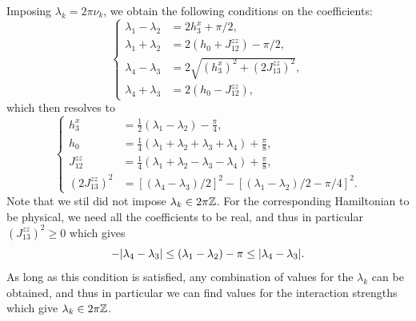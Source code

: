 Imposing $\lambda_k=2\pi\nu_k$, we obtain the following conditions on the coefficients:
\begin{equation}
\begin{cases}
    \lambda_1 - \lambda_2 &= 2 h_3^x + \pi/2, \\
    \lambda_1 + \lambda_2 &= 2(h_0 + J_{12}^{zz}) - \pi/2, \\
    \lambda_4 - \lambda_3 &= 2\sqrt{(h_3^x)^2+ (2J_{13}^{zz})^2}, \\
    \lambda_4 + \lambda_3 &= 2(h_0 - J_{12}^{zz}),
\end{cases}
\label{eq:toffoli_lambdas_vs_parameters}
\end{equation}
which then resolves to
\begin{equation}
\begin{cases}%
    h_3^x &= \frac{1}{2}(\lambda_1 - \lambda_2) - \frac{\pi}{4}, \\
    h_0 &= \frac{1}{4}(\lambda_1 + \lambda_2 + \lambda_3 + \lambda_4) + \frac{\pi}{8}, \\
    J_{12}^{zz} &= \frac{1}{4}(\lambda_1 + \lambda_2 - \lambda_3 - \lambda_4) + \frac{\pi}{8}, \\
    (2J_{13}^{zz})^2 &=
    [(\lambda_4-\lambda_3)/2]^2 -
    [(\lambda_1-\lambda_2)/2 - \pi/4]^2.
\end{cases}
\end{equation}
Note that we stil did not impose $\lambda_k\in2\pi\mathbb{Z}$. For the corresponding Hamiltonian to be physical, we need all the coefficients to be real, and thus in particular $(J_{13}^{zz})^2\ge0$ which gives
\begin{equation}
    -\abs{\lambda_4 -\lambda_3} \le
    (\lambda_1 - \lambda_2) - \pi \le \abs{\lambda_4 -\lambda_3}.
    \label{eq:toffoli_lambdas_condition}
\end{equation}
As long as this condition is satisfied, any combination of values for the $\lambda_k$ can be obtained, and thus in particular we can find values for the interaction strengths which give $\lambda_k\in2\pi\mathbb{Z}$.

